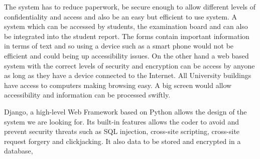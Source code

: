 \documentclass[../main.tex]{subfiles}
\begin{document}
\raggedright
The system has to reduce paperwork, be secure enough to allow different levels of confidentiality and access and also be an easy but efficient to use system. A system which can be accessed by students, the examination board and can also be integrated into the student report. The forms contain important information in terms of text and so using a device such as a smart phone would not be efficient and could being up accessibility issues. On the other hand a web based system with the correct levels of security and encryption can be access by anyone as long as they have a device connected to the Internet. All University buildings have access to computers making browsing easy. A big screen would allow accessibility and information can be processed swiftly.

Django\cite{django}, a high-level Web Framework based on Python allows the design of the system we are looking for. Its built-in features allows the coder to avoid and prevent security threats such as SQL injection, cross-site scripting, cross-site request forgery and clickjacking\cite{django}. It also data to be stored and encrypted in a database, 
\end{document}
